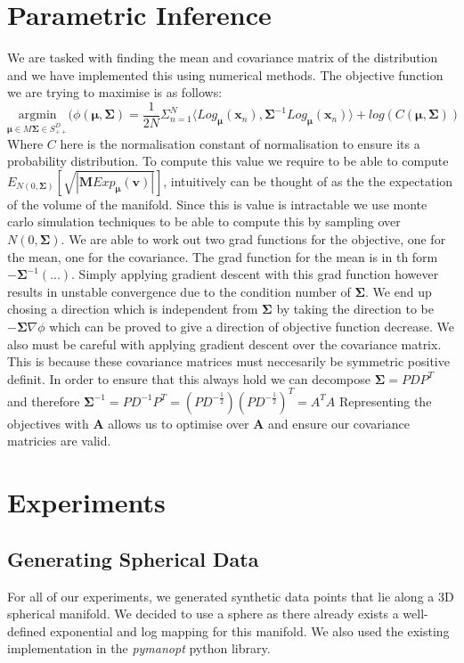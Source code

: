 \documentclass{article}
\begin{document}
\section{Parametric Inference}
\label{sec:parametric_inference}
We are tasked with finding the mean and covariance matrix of the distribution and we have implemented this using numerical methods.
The objective function we are trying to maximise is as follows:
$$\underset{\bm{\mu} \in M \bm{\Sigma} \in S_{++}^D}{\text{argmin}}(\phi(\bm{\mu},\bm{\Sigma})
=\frac{1}{2N}\Sigma_{n=1}^N\langle Log_{\bm{\mu}}(\bm{x}_n),
\bm{\Sigma}^{-1}Log_{\bm{\mu}}(\bm{x}_n)\rangle
+ log(C(\bm{\mu},\bm{\Sigma}))$$
Where $C$ here is the normalisation constant of normalisation to ensure its a probability distribution.
To compute this value we require to be able to compute $E_{N(0,\bm{\Sigma})}[\sqrt{|\bm{M}Exp_{\bm{\mu}}(\bm{v})|}]$,
intuitively can be thought of as the the expectation of the volume of the manifold.
Since this is value is intractable we use monte carlo simulation techniques to be able to compute this by sampling over $N(0,\bm{\Sigma})$.
We are able to work out two grad functions for the objective, one for the mean, one for the covariance.
The grad function for the mean is in th form $-\bm{\Sigma}^{-1}(...)$.
Simply applying gradient descent with this grad function however results in unstable convergence due to the condition number of $\bm{\Sigma}$.
We end up chosing a direction which is independent from $\bm{\Sigma}$ by taking the direction to be $-\bm{\Sigma}\nabla\phi$ which can be proved to give a direction of objective function decrease.
We also must be careful with applying gradient descent over the covariance matrix.
This is because these covariance matrices must neccesarily be symmetric positive definit.
In order to ensure that this always hold we can decompose $\bm{\Sigma} = PDP^T$ and therefore $\bm{\Sigma}^{-1} = PD^{-1}P^T= (PD^{-\frac{1}{2}})(PD^{-\frac{1}{2}})^T=A^TA$
Representing the objectives with $\bm{A}$ allows us to optimise over $\bm{A}$ and ensure our covariance matricies are valid.

\section{Experiments}
\subsection{Generating Spherical Data}
For all of our experiments, we generated synthetic data points that lie along a 3D spherical manifold. We decided to use a sphere as there already exists a well-defined exponential and log mapping for this manifold. We also used the existing implementation in the \textit{pymanopt} python library.
\end{document}
